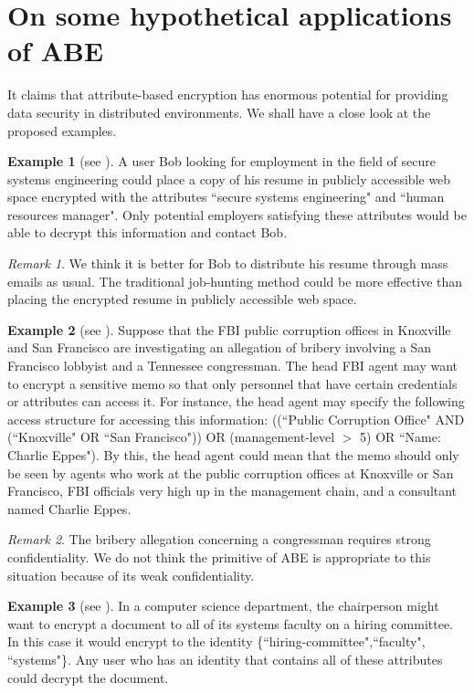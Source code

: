 \documentclass[11pt]{article}
\begin{document}
 \section{On some hypothetical applications of ABE}
It claims that
attribute-based encryption has enormous potential for providing
data security in distributed environments. We shall have a close look at the proposed examples.

\textbf{Example 1} (see \cite{PTMW06}).  A user Bob looking for
employment in the field of secure systems engineering could
place a copy of his resume in publicly accessible web space
encrypted with the attributes ``secure systems engineering"
and ``human resources manager". Only potential employers
satisfying these attributes would be able to decrypt this
information and contact Bob.

\emph{Remark 1}. We think it is better for Bob to distribute his resume through mass emails as usual.
The traditional job-hunting method could be more effective than placing the encrypted resume in publicly accessible web space.

\textbf{Example 2} (see \cite{BSW07}). Suppose that the FBI public corruption offices
in Knoxville and San Francisco are investigating
an allegation of bribery involving a San Francisco lobbyist
and a Tennessee congressman. The head FBI
agent may want to encrypt a sensitive memo so that
only personnel that have certain credentials or attributes can access it. For instance, the head agent
may specify the following access structure for accessing
this information: ((``Public Corruption Office"
AND (``Knoxville" OR ``San Francisco")) OR
(management-level $>$ 5) OR ``Name: Charlie
Eppes").  By this, the head agent could mean that the memo
should only be seen by agents who work at the public
corruption offices at Knoxville or San Francisco, FBI
officials very high up in the management chain, and a
consultant named Charlie Eppes.

\emph{Remark 2}. The bribery allegation concerning a congressman requires strong confidentiality. We do not think the primitive of ABE is appropriate to this situation because of its weak confidentiality.

\textbf{Example 3} (see \cite{SW05}).  In a computer science department, the chairperson might want to encrypt
a document to all of its systems faculty on a hiring committee. In this case it would encrypt to the
identity \{``hiring-committee",``faculty", ``systems"\}. Any user who has an identity that contains all
of these attributes could decrypt the document.
\end{document}
